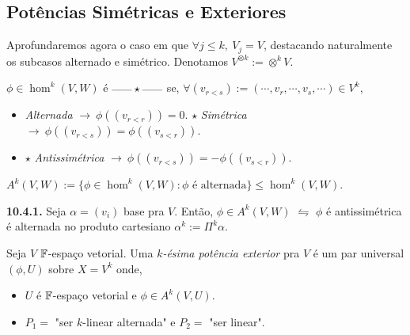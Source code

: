 \subsection{Potências Simétricas e Exteriores}

\begin{note}
    Aprofundaremos agora o caso em que \(\forall j \leq k,  \ V_j = V \), destacando naturalmente os subcasos alternado e simétrico. Denotamos \(V^{\otimes k} := \otimes^k V\). 
\end{note}

\begin{definition}
    \(\phi \in \hom^k(V,W)\) é \(\textcolor{gray}{\rotatebox{90}{\Big|}}\star\textcolor{gray}{\rotatebox{90}{\Big|}}\) se, \(\forall (v_{r<s}) := (\cdots , v_r, \cdots, v_s, \cdots)\in V^k\),   
    \vspace{-0.2cm}
    \begin{itemize}[label = \(\star\)]
        \item \emph{Alternada} \(\rightarrow \ \phi((v_{r<r})) = 0\). \hfill \(\star\) \emph{Simétrica} \(\rightarrow \ \phi((v_{r<s})) = \phi((v_{s<r}))\). 
        \item[] \hspace{3.5cm} \(\star \) \emph{Antissimétrica} \(\rightarrow \ \phi((v_{r<s})) = - \phi((v_{s<r}))\). 
    \end{itemize} 
\end{definition}

\vspace{-0.3cm}
\begin{definition}
    \centering
    \(A^k(V,W):= \{\phi \in \hom^k(V, W): \phi \text{ é alternada}\} \leq \hom^k(V,W)\). 
\end{definition}

\hypertarget{lemma1041}{}
\begin{lemma}
    \textbf{10.4.1.} Seja \(\alpha = (v_i)\) base pra \(V\). Então, \(\phi\in A^k(V,W)\) \(\leftrightharpoons\) \(\phi\) é antissimétrica é alternada no produto cartesiano \(\alpha^k := \Pi^k \alpha \). 
\end{lemma}

\begin{definition}
    Seja \(V\) \(\mathbb{F}\)-espaço vetorial. Uma $k$\emph{-ésima potência exterior} pra \(V\) é um par universal \((\phi, U)\) sobre \(X =  V^k\) onde,   
    \vspace{-0.2cm}
    \begin{itemize}[left = 1cm]
        \item \(U\) é \(\mathbb{F}\)-espaço vetorial e \(\phi \in A^k(V, U)\). 
        \item \(P_1 = \) "ser $k$-linear alternada" e \(P_2 = \) "ser linear".
    \end{itemize}  
\end{definition}


